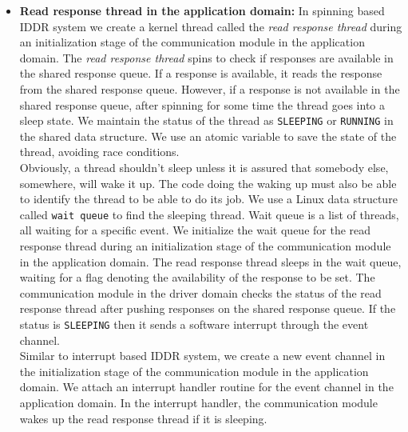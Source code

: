 \begin{itemize}
\item \textbf{Read response thread in the application domain:} 
In spinning based IDDR system we create a kernel thread called the \textit{read response thread} during an initialization stage of the communication module in the application domain. The \textit{read response thread} spins to check if responses are available in the shared response queue. If a response is available, it reads the response from the shared response queue. However, if a response is not available in the shared response queue, after spinning for some time the thread goes into a sleep state. We maintain the status of the thread as \texttt{SLEEPING} or \texttt{RUNNING} in the shared data structure. We use an atomic variable to save the state of the thread, avoiding race conditions. 
\\[3mm]
Obviously, a thread shouldn't sleep unless it is assured that somebody else, somewhere, will wake it up. The code doing the waking up must also be able to identify the thread to be able to do its job. We use a Linux data structure called \texttt{wait queue} to find the sleeping thread. Wait queue is a list of threads, all waiting for a specific event\cite{Galvin, Bovet:2005:ULK:1077084}. We initialize the wait queue for the read response thread during an initialization stage of the communication module in the application domain. The read response thread sleeps in the wait queue, waiting for a flag denoting the availability of the response to be set. The communication module in the driver domain checks the status of the read response thread after pushing responses on the shared response queue. If the status is \texttt{SLEEPING} then it sends a software interrupt through the event channel.
\\[3mm]
Similar to interrupt based IDDR system, we create a new event channel in the initialization stage of the communication module in the application domain. We attach an interrupt handler routine for the event channel in the application domain. In the interrupt handler, the communication module wakes up the read response thread if it is sleeping. 


\end{itemize}

